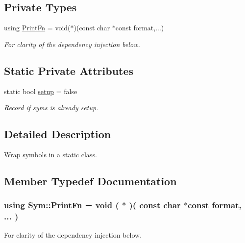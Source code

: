 \subsection*{Private Types}
\begin{DoxyCompactItemize}
\item 
using \hyperlink{struct_sym_ac7e7dab02489b946a36daebe6ecde8ad}{Print\+Fn} = void($\ast$)(const char $\ast$const format,...)
\begin{DoxyCompactList}\small\item\em For clarity of the dependency injection below. \end{DoxyCompactList}\end{DoxyCompactItemize}
\subsection*{Static Private Attributes}
\begin{DoxyCompactItemize}
\item 
static bool \hyperlink{struct_sym_a5b0d02c05e1a5450e6dc79903615ab46}{setup} = false
\begin{DoxyCompactList}\small\item\em Record if syms is already setup. \end{DoxyCompactList}\end{DoxyCompactItemize}


\subsection{Detailed Description}
Wrap symbols in a static class. 

\subsection{Member Typedef Documentation}
\subsubsection[{\texorpdfstring{Print\+Fn}{PrintFn}}]{\setlength{\rightskip}{0pt plus 5cm}using {\bf Sym\+::\+Print\+Fn} =  void ( $\ast$ )( const char $\ast$const format, ... )\hspace{0.3cm}{\ttfamily [private]}}\hypertarget{struct_sym_ac7e7dab02489b946a36daebe6ecde8ad}{}\label{struct_sym_ac7e7dab02489b946a36daebe6ecde8ad}


For clarity of the dependency injection below. 



